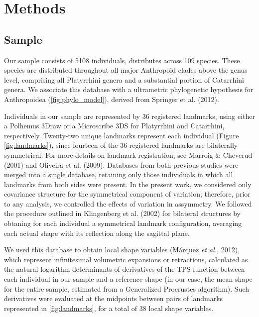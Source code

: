 \documentclass[12pt,twoside]{report}
\begin{document}
\section{Methods}\label{methods-2}

\subsection{Sample}\label{sample-2}

Our sample consists of 5108 individuals, distributes across 109 species.
These species are distributed throughout all major Anthropoid clades
above the genus level, comprising all Platyrrhini genera and a
substantial portion of Catarrhini genera. We associate this database
with a ultrametric phylogenetic hypothesis for Anthropoidea
(\autoref{fig:phylo_model}), derived from Springer et al. (2012).

Individuals in our sample are represented by 36 registered landmarks,
using either a Polhemus 3Draw or a Microscribe 3DS for Platyrrhini and
Catarrhini, respectively. Twenty-two unique landmarks represent each
individual (Figure \ref{fig:landmarks}), since fourteen of the 36
registered landmarks are bilaterally symmetrical. For more details on
landmark registration, see Marroig \& Cheverud (2001) and Oliveira et
al. (2009). Databases from both previous studies were merged into a
single database, retaining only those individuals in which all landmarks
from both sides were present. In the present work, we considered only
covariance structure for the symmetrical component of variation;
therefore, prior to any analysis, we controlled the effects of variation
in assymmetry. We followed the procedure outlined in Klingenberg et al.
(2002) for bilateral structures by obtaning for each individual a
symmetrical landmark configuration, averaging each actual shape with its
reflection along the sagittal plane.

We used this database to obtain local shape variables (Márquez \emph{et
al.}, 2012), which represent infinitesimal volumetric expansions or
retractions, calculated as the natural logarithm determinants of
derivatives of the TPS function between each individual in our sample
and a reference shape (in our case, the mean shape for the entire
sample, estimated from a Generalized Procrustes algorithm). Such
derivatives were evaluated at the midpoints between pairs of landmarks
represented in \autoref{fig:landmarks}, for a total of 38 local shape
variables.
\end{document}
